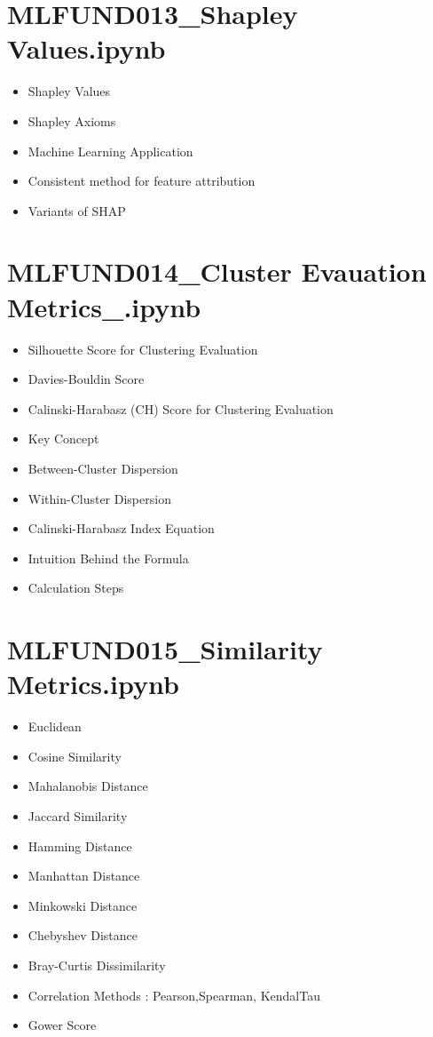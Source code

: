 \documentclass[11pt]{article}
\begin{document}
\section*{MLFUND013\_Shapley Values.ipynb}
\begin{itemize}
\item Shapley Values
\item Shapley Axioms
\item Machine Learning Application
\item Consistent method for feature attribution
\item Variants of SHAP
\end{itemize}
\section*{MLFUND014\_Cluster Evauation Metrics\_.ipynb}
\begin{itemize}
\item Silhouette Score for Clustering Evaluation
\item Davies-Bouldin Score
\item Calinski-Harabasz (CH) Score for Clustering Evaluation
\item Key Concept
\item Between-Cluster Dispersion
\item Within-Cluster Dispersion
\item Calinski-Harabasz Index Equation
\item Intuition Behind the Formula
\item Calculation Steps
\end{itemize}
\section*{MLFUND015\_Similarity Metrics.ipynb}
\begin{itemize}
\item Euclidean
\item Cosine Similarity
\item Mahalanobis Distance
\item Jaccard Similarity
\item Hamming Distance
\item Manhattan Distance
\item Minkowski Distance
\item Chebyshev Distance
\item Bray-Curtis Dissimilarity
\item Correlation Methods : Pearson,Spearman, KendalTau
\item Gower Score
\end{itemize}
\end{document}
